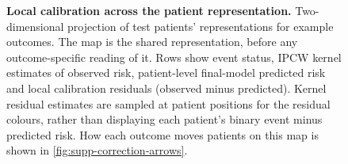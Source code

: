 \begin{figure}[p]
  \caption{\textbf{Local calibration across the patient representation.} Two-dimensional projection of test patients' representations
  for example outcomes. The map is the shared representation, before any
  outcome-specific reading of it. Rows show event status,
  IPCW kernel estimates of observed risk, patient-level final-model predicted
  risk and local calibration residuals (observed minus predicted). Kernel
  residual estimates are sampled at patient positions for the residual colours,
  rather than displaying each patient's binary event minus predicted risk.
  How each outcome moves patients on this map is shown in
  \cref{fig:supp-correction-arrows}.}
  \label{fig:supp-calibration-maps}
\end{figure}


